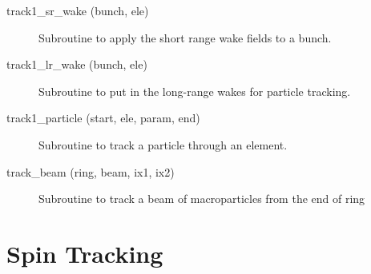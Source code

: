 \begin{description}
\item[track1\_sr\_wake (bunch, ele)] \Newline 
Subroutine to apply the short range wake fields to a bunch. 

\item[track1\_lr\_wake (bunch, ele)] \Newline 
Subroutine to put in the long-range wakes for particle tracking.

\item[track1\_particle (start, ele, param, end)] \Newline 
Subroutine to track a particle through an element.

\item[track\_beam (ring, beam, ix1, ix2)] \Newline 
     Subroutine to track a beam of macroparticles from the end of
     ring%

\end{description}

\section{Spin Tracking}
\label{r:spin_track}    


